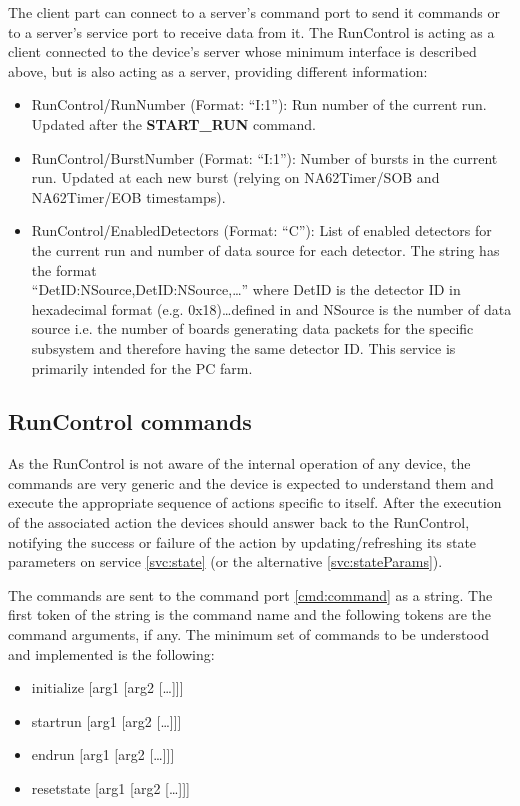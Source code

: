 \documentclass[a4paper]{article}
\begin{document}
The client part can connect to a server's command port to send it commands or to a server's
service port to receive data from it. The RunControl is acting as a client connected to the device's
server whose minimum interface is described above, but is also acting as a server, providing different information:
\begin{itemize}
	\item RunControl/RunNumber (Format: ``I:1''): Run number of the current run.
	Updated after the \textbf{START\_RUN} command.
	\item RunControl/BurstNumber (Format: ``I:1''): Number of bursts in the current
	run. Updated at each new burst (relying on NA62Timer/SOB and NA62Timer/EOB
	timestamps).
	\item RunControl/EnabledDetectors (Format: ``C''): List of enabled detectors
	for the current run and number of data source for each detector. The string
	has the format\\
	\mbox{``DetID:NSource,DetID:NSource,\ldots''} where DetID is
	the detector ID in hexadecimal format (e.g. 0x18)\ldots defined in
	\cite{biblio:TDAQNote} and NSource is the number of data source i.e. the
	number of boards generating data packets for the specific subsystem and
	therefore having the same detector ID. This service is primarily intended for
	the PC farm.
\end{itemize}

\subsection{RunControl commands}\label{sec:commands}

As the RunControl is not aware of the internal operation of any device, the commands are very
generic and the device is expected to understand them and execute the appropriate sequence of actions
specific to itself. After the execution of the associated action the devices should answer back to
the RunControl, notifying the success or failure of the action by updating/refreshing its state
parameters on service \ref{svc:state} (or the alternative \ref{svc:stateParams}).

The commands are sent to the command port \ref{cmd:command} as a string. The first token of the
string is the command name and the following tokens are the command arguments, if any. The minimum
set of commands to be understood and implemented is the following:
\begin{itemize}
	\item initialize [arg1 [arg2 [\ldots]]]
	\item startrun [arg1 [arg2 [\ldots]]]
	\item endrun [arg1 [arg2 [\ldots]]]
	\item resetstate [arg1 [arg2 [\ldots]]]
\end{itemize}
\end{document}
